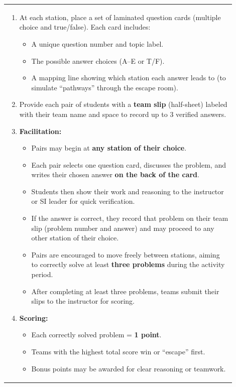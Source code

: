 \documentclass{article}
\begin{document}
\begin{tabular}{|p{0.9\linewidth}|}
\hline
\begin{enumerate}
    \item At each station, place a set of laminated question cards (multiple choice and true/false). Each card includes:
        \begin{itemize}
            \item A unique question number and topic label.
            \item The possible answer choices (A–E or T/F).
            \item A mapping line showing which station each answer leads to (to simulate “pathways” through the escape room).
        \end{itemize}
        \item Provide each pair of students with a \textbf{team slip} (half-sheet) labeled with their team name and space to record up to 3 verified answers.
    \item \textbf{Facilitation:}
    \begin{itemize}
        \item Pairs may begin at \textbf{any station of their choice}.
        \item Each pair selects one question card, discusses the problem, and writes their chosen answer \textbf{on the back of the card}.
        \item Students then show their work and reasoning to the instructor or SI leader for quick verification.
        \item If the answer is correct, they record that problem on their team slip (problem number and answer) and may proceed to any other station of their choice.
        \item Pairs are encouraged to move freely between stations, aiming to correctly solve at least \textbf{three problems} during the activity period.
        \item After completing at least three problems, teams submit their slips to the instructor for scoring.
    \end{itemize}

    \item \textbf{Scoring:}
    \begin{itemize}
        \item Each correctly solved problem = \textbf{1 point}.
        \item Teams with the highest total score win or “escape” first.
        \item Bonus points may be awarded for clear reasoning or teamwork.
    \end{itemize}


\end{enumerate}
\end{tabular}
\end{document}
